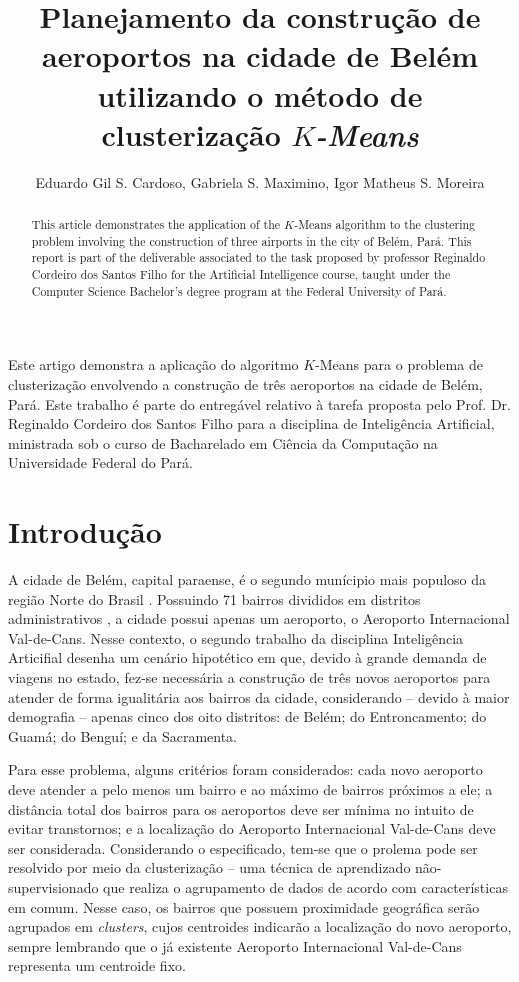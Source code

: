 \documentclass[12pt]{article}
\title{Planejamento da construção de aeroportos na cidade de Belém utilizando o método de clusterização \textit{$K$-Means}}
\author{Eduardo Gil S. Cardoso\inst{1}, Gabriela S. Maximino\inst{1}, Igor Matheus S. Moreira\inst{1}}
\begin{document}
\maketitle

\begin{abstract}
  This article demonstrates the application of the $K$-Means algorithm to the clustering problem involving the construction of three airports in the city of Belém, Pará. This report is part of the deliverable associated to the task proposed by professor Reginaldo Cordeiro dos Santos Filho for the Artificial Intelligence course, taught under the Computer Science Bachelor's degree program at the Federal University of Pará.
\end{abstract}
     
\begin{resumo} 
  Este artigo demonstra a aplicação do algoritmo $K$-Means para o problema de clusterização envolvendo a construção de três aeroportos na cidade de Belém, Pará. Este trabalho é parte do entregável relativo à tarefa proposta pelo Prof. Dr. Reginaldo Cordeiro dos Santos Filho para a disciplina de Inteligência Artificial, ministrada sob o curso de Bacharelado em Ciência da Computação na Universidade Federal do Pará.
\end{resumo}



\section{Introdução} %



A cidade de Belém, capital paraense, é o segundo munícipio mais populoso da região Norte do Brasil \cite{ibge}. Possuindo 71 bairros divididos em distritos administrativos \cite{belemwiki}, a cidade possui apenas um aeroporto, o Aeroporto Internacional Val-de-Cans. Nesse contexto, o segundo trabalho da disciplina Inteligência Articifial desenha um cenário hipotético em que, devido à grande demanda de viagens no estado, fez-se necessária a construção de três novos aeroportos para atender de forma igualitária aos bairros da cidade, considerando -- devido à maior demografia -- apenas cinco dos oito distritos: de Belém; do Entroncamento; do Guamá; do Benguí; e da Sacramenta.

Para esse problema, alguns critérios foram considerados: cada novo aeroporto deve atender a pelo menos um bairro e ao máximo de bairros próximos a ele; a distância total dos bairros para os aeroportos deve ser mínima no intuito de evitar transtornos; e a localização do Aeroporto Internacional Val-de-Cans deve ser considerada. Considerando o especificado, tem-se que o prolema pode ser resolvido por meio da clusterização -- uma técnica de aprendizado não-supervisionado que realiza o agrupamento de dados de acordo com características em comum. Nesse caso, os bairros que possuem proximidade geográfica serão agrupados em \textit{clusters}, cujos centroides indicarão a localização do novo aeroporto, sempre lembrando que o já existente Aeroporto Internacional Val-de-Cans representa um centroide fixo.
\end{document}
